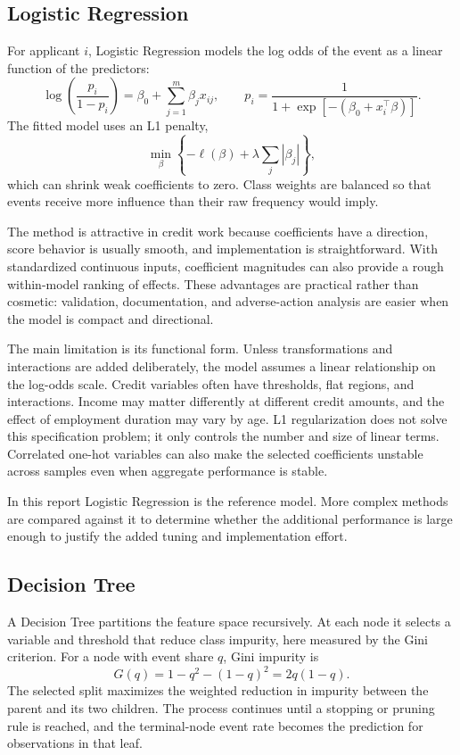 \documentclass[11pt]{article}
\begin{document}
\subsection{Logistic Regression}
For applicant $i$, Logistic Regression models the log odds of the event as a linear function of the predictors:
\begin{equation}
\log\left(\frac{p_i}{1-p_i}\right)=\beta_0+\sum_{j=1}^{m}\beta_j x_{ij},
\qquad
p_i=\frac{1}{1+\exp[-(\beta_0+x_i^\top\beta)]}.
\end{equation}
The fitted model uses an L1 penalty,
\begin{equation}
\min_{\beta}\left\{-\ell(\beta)+\lambda\sum_j |\beta_j|\right\},
\end{equation}
which can shrink weak coefficients to zero. Class weights are balanced so that events receive more influence than their raw frequency would imply.

The method is attractive in credit work because coefficients have a direction, score behavior is usually smooth, and implementation is straightforward. With standardized continuous inputs, coefficient magnitudes can also provide a rough within-model ranking of effects. These advantages are practical rather than cosmetic: validation, documentation, and adverse-action analysis are easier when the model is compact and directional.

The main limitation is its functional form. Unless transformations and interactions are added deliberately, the model assumes a linear relationship on the log-odds scale. Credit variables often have thresholds, flat regions, and interactions. Income may matter differently at different credit amounts, and the effect of employment duration may vary by age. L1 regularization does not solve this specification problem; it only controls the number and size of linear terms. Correlated one-hot variables can also make the selected coefficients unstable across samples even when aggregate performance is stable.

In this report Logistic Regression is the reference model. More complex methods are compared against it to determine whether the additional performance is large enough to justify the added tuning and implementation effort.

\subsection{Decision Tree}
A Decision Tree partitions the feature space recursively. At each node it selects a variable and threshold that reduce class impurity, here measured by the Gini criterion. For a node with event share $q$, Gini impurity is
\begin{equation}
G(q)=1-q^2-(1-q)^2=2q(1-q).
\end{equation}
The selected split maximizes the weighted reduction in impurity between the parent and its two children. The process continues until a stopping or pruning rule is reached, and the terminal-node event rate becomes the prediction for observations in that leaf.
\end{document}
